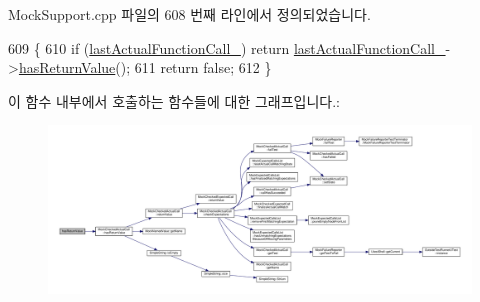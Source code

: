 Mock\+Support.\+cpp 파일의 608 번째 라인에서 정의되었습니다.


\begin{DoxyCode}
609 \{
610     \textcolor{keywordflow}{if} (\hyperlink{class_mock_support_aadd48976efe51d36597ebe298e6b9233}{lastActualFunctionCall\_}) \textcolor{keywordflow}{return} 
      \hyperlink{class_mock_support_aadd48976efe51d36597ebe298e6b9233}{lastActualFunctionCall\_}->\hyperlink{class_mock_checked_actual_call_afd6d7b809147f4ae665d5b4eb5b08431}{hasReturnValue}();
611     \textcolor{keywordflow}{return} \textcolor{keyword}{false};
612 \}
\end{DoxyCode}


이 함수 내부에서 호출하는 함수들에 대한 그래프입니다.\+:
\nopagebreak
\begin{figure}[H]
\begin{center}
\leavevmode
\includegraphics[width=350pt]{class_mock_support_a2c1778bb1802da9ba4a0a134ae7f74d7_cgraph}
\end{center}
\end{figure}




